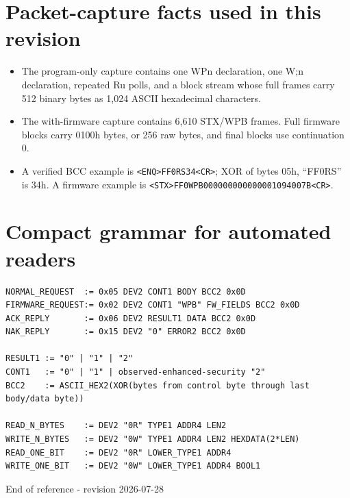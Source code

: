 \documentclass[10pt,letterpaper]{article}
\begin{document}
\section{Packet-capture facts used in this revision}
\begin{itemize}
\item The program-only capture contains one WPn declaration, one W;n declaration, repeated Ru polls, and a block stream whose full frames carry 512 binary bytes as 1,024 ASCII hexadecimal characters.
\item The with-firmware capture contains 6,610 STX/WPB frames. Full firmware blocks carry 0100h bytes, or 256 raw bytes, and final blocks use continuation 0.
\item A verified BCC example is \texttt{<ENQ>FF0RS34<CR>}; XOR of bytes 05h, ``FF0RS'' is 34h. A firmware example is \texttt{<STX>FF0WPB000000000000001094007B<CR>}.
\end{itemize}

\section{Compact grammar for automated readers}
\begin{Verbatim}[breaklines=true,breakanywhere=true,fontsize=\small]
NORMAL_REQUEST  := 0x05 DEV2 CONT1 BODY BCC2 0x0D
FIRMWARE_REQUEST:= 0x02 DEV2 CONT1 "WPB" FW_FIELDS BCC2 0x0D
ACK_REPLY       := 0x06 DEV2 RESULT1 DATA BCC2 0x0D
NAK_REPLY       := 0x15 DEV2 "0" ERROR2 BCC2 0x0D

RESULT1 := "0" | "1" | "2"
CONT1   := "0" | "1" | observed-enhanced-security "2"
BCC2    := ASCII_HEX2(XOR(bytes from control byte through last body/data byte))

READ_N_BYTES    := DEV2 "0R" TYPE1 ADDR4 LEN2
WRITE_N_BYTES   := DEV2 "0W" TYPE1 ADDR4 LEN2 HEXDATA(2*LEN)
READ_ONE_BIT    := DEV2 "0R" LOWER_TYPE1 ADDR4
WRITE_ONE_BIT   := DEV2 "0W" LOWER_TYPE1 ADDR4 BOOL1
\end{Verbatim}

\vfill
\begin{center}
\small End of reference - revision 2026-07-28
\end{center}
\end{document}

